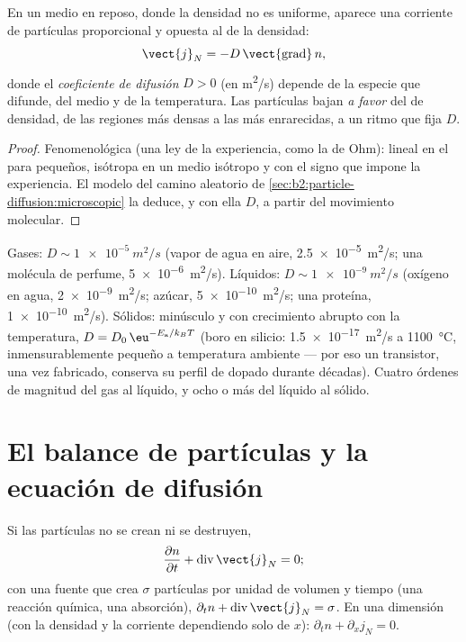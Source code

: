 \begin{theorem}\label{thm:b2:particle-diffusion:fick}
En un medio en reposo, donde la densidad no es uniforme, aparece una
corriente de partículas proporcional y opuesta al  de la
densidad:
\[
\vect{j}_N = -D\,\vect{\operatorname{grad}}\,n ,
\]
donde el \emph{coeficiente de difusión}
$D > 0$ (en \unit{m^2/s}) depende de la especie que difunde, del
medio y de la temperatura. Las partículas bajan \emph{a favor} del 
de densidad, de las regiones más densas a las más enrarecidas, a un ritmo que fija $D$.
\end{theorem}

\begin{proof}
Fenomenológica (una ley de la experiencia, como la de Ohm): lineal en el
 para  pequeños, isótropa en un medio isótropo y
con el signo que impone la experiencia. El modelo del camino aleatorio de
\cref{sec:b2:particle-diffusion:microscopic} la deduce, y con ella $D$,
a partir del movimiento molecular.
\end{proof}

\begin{example}\label{ex:b2:particle-diffusion:orders}
Gases: $D \sim \qty{1e-5}{m^2/s}$ (vapor de agua en aire,
\qty{2.5e-5}{m^2/s}; una molécula de perfume, \qty{5e-6}{m^2/s}). Líquidos:
$D \sim \qty{1e-9}{m^2/s}$ (oxígeno en agua, \qty{2e-9}{m^2/s}; azúcar,
\qty{5e-10}{m^2/s}; una proteína, \qty{1e-10}{m^2/s}). Sólidos: minúsculo y
con crecimiento abrupto con la temperatura, $D = D_0\,\eu^{-E_{\text{a}}/k_BT}$
(boro en silicio: \qty{1.5e-17}{m^2/s} a \qty{1100}{\celsius},
inmensurablemente pequeño a temperatura ambiente --- por eso un transistor,
una vez fabricado, conserva su perfil de dopado durante décadas). Cuatro órdenes de
magnitud del gas al líquido, y ocho o más del líquido al sólido.
\end{example}

\section{El balance de partículas y la ecuación de difusión}

\begin{theorem}\label{thm:b2:particle-diffusion:balance}
Si las partículas no se crean ni se destruyen,
\[
\frac{\partial n}{\partial t} + \operatorname{div}\vect{j}_N = 0 ;
\]
con una fuente que crea $\sigma$ partículas por unidad de volumen y tiempo
(una reacción química, una absorción), $\partial_t n +
\operatorname{div}\vect{j}_N = \sigma$. En una dimensión (con la densidad y la
corriente dependiendo solo de $x$): $\partial_t n + \partial_x j_N = 0$.
\end{theorem}

